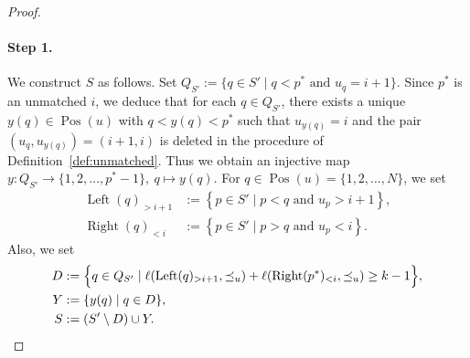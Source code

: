 \documentclass[reqno]{amsart}
\theoremstyle{definition}
\theoremstyle{remark}
\numberwithin{equation}{section}
\begin{document}
\begin{proof}
		\paragraph{\bf Step 1.} We construct $S$ as follows.
		Set $Q_{S'}:=\{q\in S'\mid q<p^\ast\text{ and }u_q=i+1\}.$
		Since $p^\ast$ is an unmatched $i$,
		we deduce that for each $q\in Q_{S'}$,
		there exists a unique $y(q)\in\operatorname{Pos}(u)$ with $q<y(q)<p^\ast$ such that $u_{y(q)}=i$ and the pair $(u_q,u_{y(q)})=(i+1,i)$ is deleted in the procedure of Definition~\ref{def:unmatched}.
		Thus we obtain an injective map $y:Q_{S'}\to \{1,2,\dots,p^\ast-1\},\ q\mapsto y(q)$.
		For $q\in \operatorname{Pos}(u)=\{1,2,\dots,N\}$, we set
		\begin{align*}
			\operatorname{Left}(q)_{>i+1}&:=\left\{p\in S'\mid p<q\text{ and }u_p>i+1\right\}, \\
			\operatorname{Right}(q)_{<i\;}&:=\left\{p\in S'\mid p>q\text{ and }u_p<i\right\}.
		\end{align*}
		Also, we set
		\begin{align*}
			D&:=\Bigl\{q\in Q_{S'}\mid\ell(\operatorname{Left}(q)_{>i+1},\preceq_u)+\ell(\operatorname{Right}(p^\ast)_{<i},\preceq_u)\ge k-1\Bigr\},\\
			Y&:=\{y(q)\mid q\in D\},\\
			S&:=(S'\setminus D)\cup Y.
		\end{align*}

\end{proof}
\end{document}
